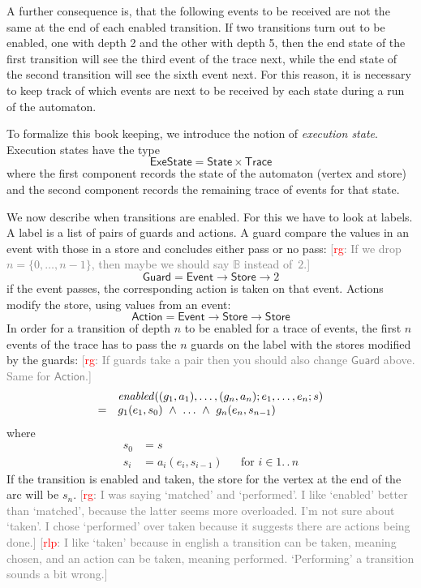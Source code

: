 \documentclass[preprint]{sigplanconf} %
\newcommand{\note}[2]{\textcolor{gray}{[\textcolor{red}{#1}: #2]}}
\newcommand{\rg}[1]{\note{rg}{#1}}
\newcommand{\rlp}[1]{\note{rlp}{#1}}
\newcommand{\B}{\ensuremath{\mathbb{B}}}
\newcommand{\set}[1]{\ensuremath{\mathsf{#1}}}
\newcommand{\functionfont}[1]{\mathit{#1}}
\newcommand{\enabled}{\functionfont{enabled}}
\theoremstyle{definition}
\theoremstyle{remark}
\begin{document}
A further consequence is, that the following events to be received are
not the same at the end of each enabled transition. If two transitions
turn out to be enabled, one with depth 2 and the other with depth 5,
then the end state of the first transition will see the third event of
the trace next, while the end state of the second transition will see
the sixth event next. For this reason, it is necessary to keep track
of which events are next to be received by each state during a run of
the automaton.

To formalize this book keeping, we introduce the notion of
\emph{execution state}. Execution states have the type
\[
\set{ExeState} = \set{State}\times\set{Trace}
\]
where the first component records the state of the automaton (vertex
and store) and the second component records the remaining trace of
events for that state.

We now describe when transitions are enabled. For this we have to look
at labels. A label is a list of pairs of guards and actions. A
guard compare the values in an event with those in a store and
concludes either pass or no pass:
\rg{If we drop $n=\{0,\ldots,n-1\}$, then maybe we should say $\B$ instead of~$2$.}
\[
\set{Guard} = \set{Event}\to\set{Store}\to2
\]
if the event passes, the corresponding action is taken on that event.
Actions modify the store, using values from an event:
\[
\set{Action} = \set{Event}\to\set{Store}\to\set{Store}
\]
In order for a transition of depth $n$ to be enabled for a trace of
events, the first $n$ events of the trace has to pass the $n$ guards
on the label with the stores modified by the guards:
\rg{If guards take a pair then you should also change \set{Guard} above.
Same for \set{Action}.}
\[
\begin{array}{c l}
& \enabled((g_1, a_1), \ldots, (g_n, a_n); e_1, \ldots, e_n; s) \\
 = &
g_1(e_1, s_0)\ \land\ \ldots\ \land\ g_n(e_n, s_{n-1}) 
\end{array}
\]
where
\begin{align}
  s_0 &=  s \\
  s_i &= a_i(e_i, s_{i-1}) &&\text{for $i\in1.\,.\,n$}
\end{align}
If the transition is enabled and taken, the store for the vertex at the end of the arc will be $s_n$.
\rg{I was saying `matched' and `performed'.
I like `enabled' better than `matched', because the latter seems more overloaded.
I'm not sure about `taken'.
I chose `performed' over taken because it suggests there are actions being done.}
\rlp{I like `taken' because in english a transition can be taken,
  meaning chosen, and an action can be taken, meaning
  performed. `Performing' a transition sounds a bit wrong.}
\end{document}

